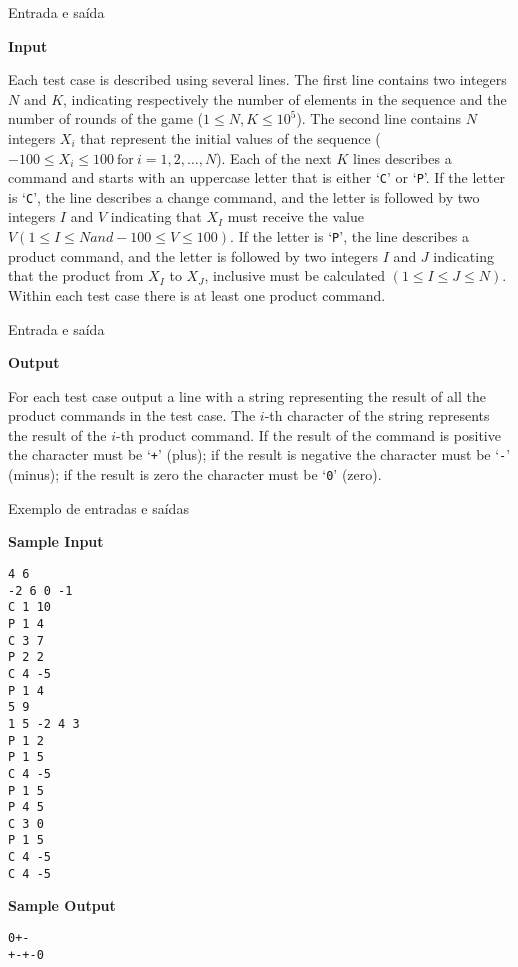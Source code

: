 \begin{frame}[fragile]{Entrada e saída}

\textbf{Input}

Each test case is described using several lines. The first line contains two integers $N$ and 
$K$, indicating respectively the number of elements in the sequence and the number of rounds of 
the game ($1\leq N, K\leq 10^5$). The second line contains $N$ integers $X_i$ that represent the 
initial values of the sequence ($-100\leq X_i\leq 100\ \mbox{for}\ i = 1, 2, \ldots, N$). Each of the next 
$K$ lines describes a command and starts with an uppercase letter that is either `\texttt{C}' or 
`\texttt{P}'. If the letter is `\texttt{C}', the line describes a change command, and
the letter is followed by two integers $I$ and $V$ indicating that $X_I$ must receive the value 
$V (1\leq I\leq N and -100\leq V\leq 100)$. If the letter is `\texttt{P}', the line describes a 
product command, and the letter is followed by two integers $I$ and $J$ indicating that the 
product from $X_I$ to $X_J$, inclusive must be calculated $(1\leq I\leq J\leq N)$. Within each 
test case there is at least one product command.

\end{frame}

\begin{frame}[fragile]{Entrada e saída}

\textbf{Output}

For each test case output a line with a string representing the result of all the product commands 
in the test case. The $i$-th character of the string represents the result of the $i$-th product 
command. If the result of the command is positive the character must be `\texttt{+}' (plus); if 
the result is negative the character must be `\texttt{-}' (minus); if the result is zero the 
character must be `\texttt{0}' (zero).

\end{frame}


\begin{frame}[fragile]{Exemplo de entradas e saídas}

\begin{scriptsize}
\begin{minipage}[t]{0.6\textwidth}
\textbf{Sample Input}
\begin{verbatim}
4 6
-2 6 0 -1
C 1 10
P 1 4
C 3 7
P 2 2
C 4 -5
P 1 4
5 9
1 5 -2 4 3
P 1 2
P 1 5
C 4 -5
P 1 5
P 4 5
C 3 0
P 1 5
C 4 -5
C 4 -5
\end{verbatim}
\end{minipage}
\begin{minipage}[t]{0.35\textwidth}
\textbf{Sample Output}
\begin{verbatim}
0+-
+-+-0
\end{verbatim}
\end{minipage}
\end{scriptsize}

\end{frame}

